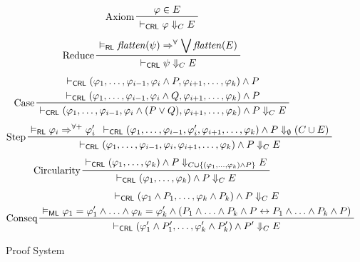 \documentclass{article}
\newcommand{\RL}{\mathsf{RL}}
\newcommand{\ML}{\mathsf{ML}}
\newcommand{\CRL}{\mathsf{CRL}}
\begin{document}
\begin{figure}
    \centering
    \begin{align*}
    & \prftree[l]{Axiom}{\varphi \in E}{\vdash_\CRL \varphi \Downarrow_{C} E}
    \end{align*}
    \begin{align*}
    & \prftree[l]{Reduce}
      {\vDash_\RL \mathit{flatten}(\psi) \Rightarrow^\forall \bigvee  \mathit{flatten}(E)}
      {\vdash_\CRL \psi \Downarrow_{C} E}
    \end{align*}
    \begin{align*}
    & \prftree[l]{Case}
    { \prfStackPremises
      {\vdash_\CRL (\varphi_1, \ldots, \varphi_{i-1}, \varphi_i \land P, \varphi_{i+1}, \ldots, \varphi_k) \land P }
      {\vdash_\CRL (\varphi_1, \ldots, \varphi_{i-1}, \varphi_i \land Q, \varphi_{i+1}, \ldots, \varphi_k) \land P }
    }
    {\vdash_\CRL (\varphi_1, \ldots, \varphi_{i-1}, \varphi_i \land (P \lor Q), \varphi_{i+1}, \ldots, \varphi_k) \land P \Downarrow_{C} E}
    \end{align*}
    \begin{align*}
    & \prftree[l]{Step}
    {\vDash_\RL \varphi_i \Rightarrow^{\forall+} \varphi_i^\prime}
    { \vdash_\CRL (\varphi_1, \ldots, \varphi_{i-1}, \varphi_i^\prime, \varphi_{i+1}, \ldots, \varphi_k)
      \land P
      \Downarrow_{\emptyset} (C \cup E)
    }
    {\vdash_\CRL (\varphi_1, \ldots, \varphi_{i-1}, \varphi_i, \varphi_{i+1}, \ldots, \varphi_k) \land P \Downarrow_{C} E}
    \end{align*}
    \begin{align*}
    & \prftree[l]{Circularity}
      { \vdash_\CRL (\varphi_1, \ldots, \varphi_k) \land P \Downarrow_{C \cup \{ (\varphi_1, \ldots, \varphi_k) \land P \} } E}
      { \vdash_\CRL (\varphi_1, \ldots, \varphi_k) \land P \Downarrow_{C} E}
    \end{align*}
    \begin{align*}
    & \prftree[l]{Conseq}
      { \prfStackPremises
        { \vdash_\CRL (\varphi_1 \land P_1, \ldots, \varphi_k \land P_k) \land P \Downarrow_{C} E}
        { \vDash_\ML \varphi_1 = \varphi_1^\prime \land \ldots \land \varphi_k = \varphi_k^\prime
        \land (P_1 \land \ldots \land P_k \land P \leftrightarrow P_1 \land \ldots \land P_k \land P) }
      }
      { \vdash_\CRL (\varphi_1^\prime \land P_1^\prime, \ldots, \varphi_k^\prime \land P_k^\prime) \land P^\prime \Downarrow_{C} E}
    \end{align*}
    \caption{Proof System}
    \label{fig:my_label}
\end{figure}
\end{document}
